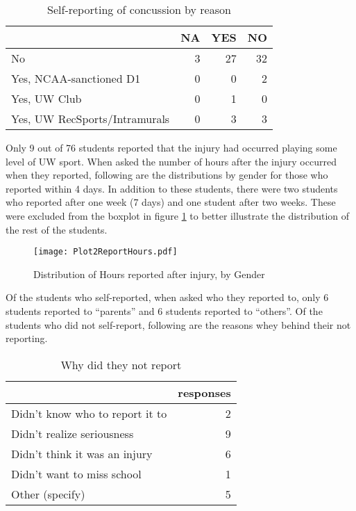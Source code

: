\documentclass[11]{article}
\begin{document}
\begin{table}[H]
\centering
\begin{tabular}{lrrr}
  \hline
 & NA & YES & NO \\ 
  \hline
No &   3 &  27 &  32 \\ 
  Yes, NCAA-sanctioned D1 &   0 &   0 &   2 \\ 
  Yes, UW Club &   0 &   1 &   0 \\ 
  Yes, UW RecSports/Intramurals &   0 &   3 &   3 \\ 
   \hline
\end{tabular}
\caption{Self-reporting of concussion by reason} 
\label{tab:Tab7Reason}
\end{table}Only 9 out of 76 students reported that the injury had occurred playing some level of UW sport. When asked the number of hours after the injury occurred when they reported, following are the distributions by gender for those who reported within 4 days. In addition to these students, there were two students who reported after one week (7 days) and one student after two weeks. These were excluded from the boxplot in figure \ref{fig:Fig3HoursGender} to better illustrate the distribution of the rest of the students.
\begin{figure}[H]
\centering
\texttt{[image: Plot2ReportHours.pdf]}
\caption{Distribution of Hours reported after injury, by Gender}
\label{fig:Fig3HoursGender}
\end{figure}

Of the students who self-reported, when asked who they reported to, only 6 students reported to ``parents'' and 6 students reported to ``others''. Of the students who did not self-report, following are the reasons whey behind their not reporting.
\begin{table}[H]
\centering
\begin{tabular}{l|r}
  \hline
 & responses \\ 
  \hline
Didn't know who to report it to &   2 \\ 
  Didn't realize seriousness &   9 \\ 
  Didn't think it was an injury &   6 \\ 
  Didn't want to miss school &   1 \\ 
  Other (specify) &   5 \\ 
   \hline
\end{tabular}
\caption{Why did they not report} 
\label{tab:Tab8WhyNot}
\end{table}
\end{document}
